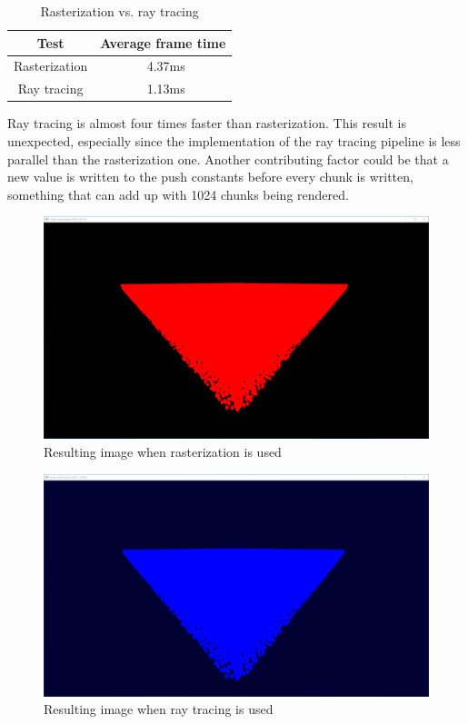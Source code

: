 \documentclass[times, utf8, zavrsni, numeric]{fer}
\begin{document}
\begin{table}[H]
\caption{Rasterization vs. ray tracing}
\begin{center}
\begin{tabular}{|c|c|}
\hline
Test & Average frame time \\
\hline
Rasterization & ~4.37ms \\
\hline
Ray tracing & ~1.13ms \\
\hline
\end{tabular}
\label{table:ras_vs_ray}
\end{center}
\end{table}

Ray tracing is almost four times faster than rasterization. This result is unexpected, especially since the implementation of the ray tracing pipeline is less parallel than the rasterization one. Another contributing factor could be that a new value is written to the push constants before every chunk is written, something that can add up with 1024 chunks being rendered.

\begin{center}
\begin{figure}[H]
\includegraphics[width=1\textwidth]{tests/raster_simple.png}
\caption{Resulting image when rasterization is used}
\label{image:raster_simple}
\end{figure}
\end{center}

\begin{center}
\begin{figure}[H]
\includegraphics[width=1\textwidth]{tests/ray_trace_simple.png}
\caption{Resulting image when ray tracing is used}
\label{image:ray_trace_simple}
\end{figure}
\end{center}
\end{document}
